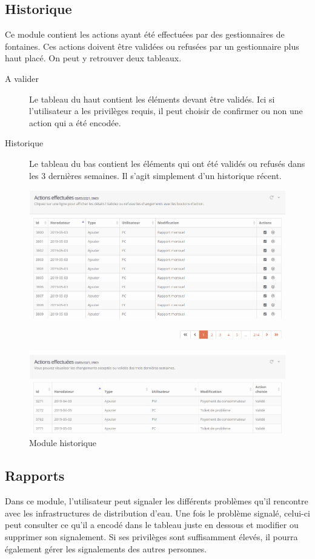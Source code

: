 \documentclass{EPL-master-thesis-covers-FR}
\begin{document}
			\subsection{Historique}
				Ce module contient les actions ayant été effectuées par des gestionnaires de fontaines. Ces actions doivent être validées ou refusées par un gestionnaire plus haut placé. On peut y retrouver deux tableaux.
				\begin{description}
					\item[A valider] Le tableau du haut contient les éléments devant être validés. Ici si l'utilisateur a les privilèges requis, il peut choisir de confirmer ou non une action qui a été encodée.
					\item[Historique] Le tableau du bas contient les éléments qui ont été validés ou refusés dans les 3 dernières semaines. Il s'agit simplement d'un historique récent.
				\end{description}
				\begin{figure}[H]
					\centering
					\includegraphics[width=1\textwidth]{images/logs}
					\caption{Module historique}
				\end{figure}
			
			\subsection{Rapports}
				Dans ce module, l'utilisateur peut signaler les différents problèmes qu'il rencontre avec les infrastructures de distribution d'eau. Une fois le problème signalé, celui-ci peut consulter ce qu'il a encodé dans le tableau juste en dessous et modifier ou supprimer son signalement. Si ses privilèges sont suffisamment élevés, il pourra également gérer les signalements des autres personnes.
				
\end{document}
